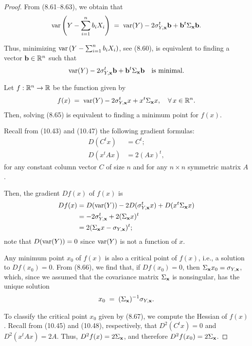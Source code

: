 \begin{proof}
From (8.61--8.63), we obtain that
\begin{equation}
\operatorname{var}\left(Y-\sum_{i=1}^n b_iX_i\right) \;=\; \operatorname{var}(Y) - 2\sigma_{Y,\mathbf{x}}^t\mathbf{b} +
\mathbf{b}^t\Sigma_{\mathbf{x}}\mathbf{b}.
\end{equation}

Thus, minimizing $\operatorname{var}\left(Y-\sum_{i=1}^n b_iX_i\right)$, see (8.60), is equivalent to
finding a vector $\mathbf{b}\in\mathbb{R}^n$ such that
\begin{equation}
\operatorname{var}(Y) - 2\sigma_{Y,\mathbf{x}}^t\mathbf{b} + \mathbf{b}^t\Sigma_{\mathbf{x}}\mathbf{b} \quad \text{is minimal.}
\end{equation}

Let $f:\mathbb{R}^n\to\mathbb{R}$ be the function given by
\[
f(x) \;=\; \operatorname{var}(Y) - 2\sigma_{Y,\mathbf{x}}^tx + x^t\Sigma_{\mathbf{x}}x, \quad \forall\, x\in\mathbb{R}^n.
\]
Then, solving (8.65) is equivalent to finding a minimum point for $f(x)$.

Recall from (10.43) and (10.47) the following gradient formulas:
\[
\begin{aligned}
D(C^tx) &= C^t; \\
D\left(x^tAx\right) &= 2(Ax)^t,
\end{aligned}
\]
for any constant column vector $C$ of size $n$ and for any $n\times n$ symmetric matrix
$A$.

Then, the gradient $Df(x)$ of $f(x)$ is
\begin{align}
Df(x) &= D(\operatorname{var}(Y)) - 2D(\sigma_{Y,\mathbf{x}}^tx) + D(x^t\Sigma_{\mathbf{x}}x) \notag\\
&= -2\sigma_{Y,\mathbf{x}}^t + 2(\Sigma_{\mathbf{x}}x)^t \notag\\
&= 2(\Sigma_{\mathbf{x}}x - \sigma_{Y,\mathbf{x}})^t;
\end{align}
note that $D(\operatorname{var}(Y)) = 0$ since $\operatorname{var}(Y)$ is not a function of $x$.

Any minimum point $x_0$ of $f(x)$ is also a critical point of $f(x)$, i.e., a solution to
$Df(x_0) = 0$. From (8.66), we find that, if $Df(x_0) = 0$, then $\Sigma_{\mathbf{x}}x_0 =
\sigma_{Y,\mathbf{x}}$, which, since we assumed that the covariance matrix $\Sigma_{\mathbf{x}}$ is
nonsingular, has the unique solution
\begin{equation}
x_0 \;=\; (\Sigma_{\mathbf{x}})^{-1}\sigma_{Y,\mathbf{x}}.
\end{equation}

To classify the critical point $x_0$ given by (8.67), we compute the Hessian of $f(x)$.
Recall from (10.45) and (10.48), respectively, that $D^2(C^tx) = 0$ and
$D^2\left(x^tAx\right) = 2A$. Thus, $D^2f(x) = 2\Sigma_{\mathbf{x}}$, and therefore $D^2f(x_0)
= 2\Sigma_{\mathbf{x}}$.


\end{proof}
